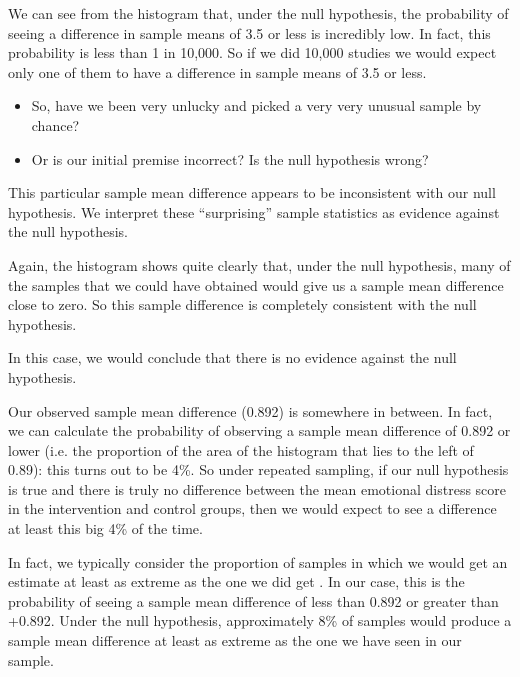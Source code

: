 \documentclass[letterpaper,10pt,english]{jupyterBook}
\begin{document}
\sphinxAtStartPar
{} We can see from the histogram that, under the null hypothesis, the probability of seeing a difference in sample means of \sphinxhyphen{}3.5 or less is incredibly low. In fact, this probability is less than 1 in 10,000. So if we did 10,000 studies we would expect only one of them to have a difference in sample means of \sphinxhyphen{}3.5 or less.
\begin{itemize}
\item {} 
\sphinxAtStartPar
So, have we been very unlucky and picked a very very unusual sample by chance?

\item {} 
\sphinxAtStartPar
Or is our initial premise incorrect? Is the null hypothesis wrong?

\end{itemize}

\sphinxAtStartPar
This particular sample mean difference appears to be inconsistent with our null hypothesis. We interpret these “surprising” sample statistics as evidence against the null hypothesis.

\sphinxAtStartPar
{} Again, the histogram shows quite clearly that, under the null hypothesis, many of the samples that we could have obtained would give us a sample mean difference close to zero. So this sample difference is completely consistent with the null hypothesis.

\sphinxAtStartPar
In this case, we would conclude that there is no evidence against the null hypothesis.

\sphinxAtStartPar
{} Our observed sample mean difference (\sphinxhyphen{}0.892) is somewhere in between. In fact, we can calculate the probability of observing a sample mean difference of \sphinxhyphen{}0.892 or lower (i.e. the proportion of the area of the histogram that lies to the left of \sphinxhyphen{}0.89): this turns out to be 4\%. So under repeated sampling, if our null hypothesis is true and there is truly no difference between the mean emotional distress score in the intervention and control groups, then we would expect to see a difference at least this big 4\% of the time.

\sphinxAtStartPar
In fact, we typically consider the proportion of samples in which we would get an estimate at least as extreme as the one we did get . In our case, this is the probability of seeing a sample mean difference of less than \sphinxhyphen{}0.892 or greater than +0.892. Under the null hypothesis, approximately 8\% of samples would produce a sample mean difference at least as extreme as the one we have seen in our sample.
\end{document}
